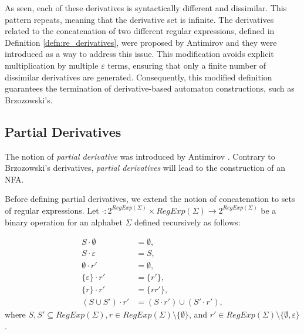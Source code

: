 As seen, each of these derivatives is syntactically different and dissimilar.
This pattern repeats, meaning that the derivative set is infinite.
The derivatives related to the concatenation of two different regular expressions, defined in Definition \ref{defn:re_derivatives}, were proposed by Antimirov \cite{pdregex_antimirov} and they were introduced as a way to address this issue. This modification avoids explicit multiplication by multiple $\varepsilon$ terms, ensuring that only a finite number of dissimilar derivatives are generated.
Consequently, this modified definition guarantees the termination of derivative-based automaton constructions, such as Brzozowski's.





\subsection{Partial Derivatives}
The notion of \textit{partial derivative} was introduced by Antimirov \cite{pdregex_antimirov}. Contrary to Brzozowski's derivatives, \textit{partial derivatives} will lead to the construction of an NFA.

Before defining partial derivatives, we extend the notion of concatenation to sets of regular expressions. Let $\cdot : 2^{RegExp(\Sigma)} \times RegExp(\Sigma) \rightarrow 2^{RegExp(\Sigma)}$ be a binary operation for an alphabet $\Sigma$ defined recursively as follows:

\begin{align*}
	S \cdot \emptyset &= \emptyset, \\
	S \cdot \varepsilon &= S, \\
	\emptyset \cdot r' &= \emptyset, \\
	\{ \varepsilon \} \cdot r' &= \{ r' \}, \\
	\{ r \} \cdot r' &= \{rr'\}, \\
	(S \cup S') \cdot r' &= (S \cdot r') \cup (S' \cdot r'),
\end{align*}
where $S, S' \subseteq RegExp(\Sigma), r \in RegExp(\Sigma) \setminus \{\emptyset\}$, and $r' \in RegExp(\Sigma) \setminus \{\emptyset, \varepsilon\}$.

